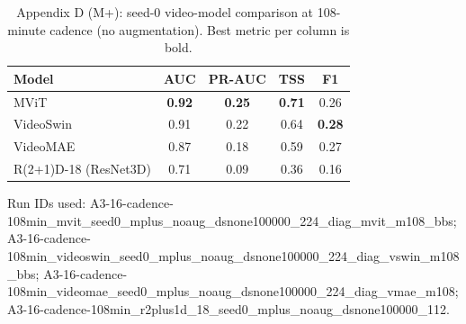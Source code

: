 \begin{table}[p]
\centering
\scriptsize
\caption{Appendix D (M+): seed-0 video-model comparison at 108-minute cadence (no augmentation). Best metric per column is bold.}
\label{tab:appD_video_m}
\begin{tabular}{lcccc}
\toprule
Model & AUC & PR-AUC & TSS & F1 \\
\midrule
MViT & \textbf{0.92} & \textbf{0.25} & \textbf{0.71} & 0.26 \\
VideoSwin & 0.91 & 0.22 & 0.64 & \textbf{0.28} \\
VideoMAE & 0.87 & 0.18 & 0.59 & 0.27 \\
R(2+1)D-18 (ResNet3D) & 0.71 & 0.09 & 0.36 & 0.16 \\
\bottomrule
\end{tabular}
\vspace{2mm}
\begin{flushleft}\scriptsize Run IDs used: A3-16-cadence-108min\_mvit\_seed0\_mplus\_noaug\_dsnone100000\_224\_diag\_mvit\_m108\_bbs; A3-16-cadence-108min\_videoswin\_seed0\_mplus\_noaug\_dsnone100000\_224\_diag\_vswin\_m108\_bbs; A3-16-cadence-108min\_videomae\_seed0\_mplus\_noaug\_dsnone100000\_224\_diag\_vmae\_m108; A3-16-cadence-108min\_r2plus1d\_18\_seed0\_mplus\_noaug\_dsnone100000\_112.\end{flushleft}
\end{table}
